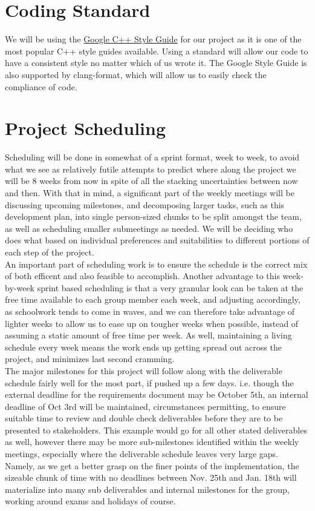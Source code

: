 \documentclass{article}
\begin{document}
\section{Coding Standard}
We will be using the \href{https://google.github.io/styleguide/cppguide.html}{Google C++ Style Guide} for our project as it is one of the most popular C++ style guides available. Using a standard will allow our code to have a consistent style no matter which of us wrote it.
The Google Style Guide is also supported by clang-format, which will allow us to easily check the compliance of code.

\section{Project Scheduling}
	Scheduling will be done in somewhat of a sprint format, week to week, to avoid what we see as relatively futile attempts to predict where along the project we will be 8 weeks
from now in spite of all the stacking uncertainties between now and then. With that in mind, a significant part of the weekly meetings will be discussing upcoming milestones,
and decomposing larger tasks, such as this development plan, into single person-sized chunks to be split amongst the team, as well as scheduling smaller submeetings as needed.
We will be deciding who does what based on individual preferences and suitabilities to different portions of each step of the project.\\

	An important part of scheduling work is to ensure the schedule is the correct mix of both efficent and also feasible to accomplish. Another advantage to this week-by-week
sprint based scheduling is that a very granular look can be taken at the free time available to each group member each week, and adjusting accordingly, as schoolwork tends
to come in waves, and we can therefore take advantage of lighter weeks to allow us to ease up on tougher weeks when possible, instead of assuming a static amount of free
time per week. As well, maintaining a living schedule every week means the work ends up getting spread out across the project, and minimizes last second cramming.\\

	The major milestones for this project will follow along with the deliverable schedule fairly well for the most part, if pushed up a few days. i.e. though the external deadline
for the requirements document may be October 5th, an internal deadline of Oct 3rd will be maintained, circumstances permitting, to ensure suitable time to review and double
check deliverables before they are to be presented to stakeholders. This example would go for all other stated deliverables as well, however there may be more sub-milestones
identified within the weekly meetings, especially where the deliverable schedule leaves very large gaps. Namely, as we get a better grasp on the finer points of the 
implementation, the sizeable chunk of time with no deadlines between Nov. 25th and Jan. 18th will materialize into many sub deliverables and internal milestones for the group,
working around exams and holidays of course. 
\end{document}

